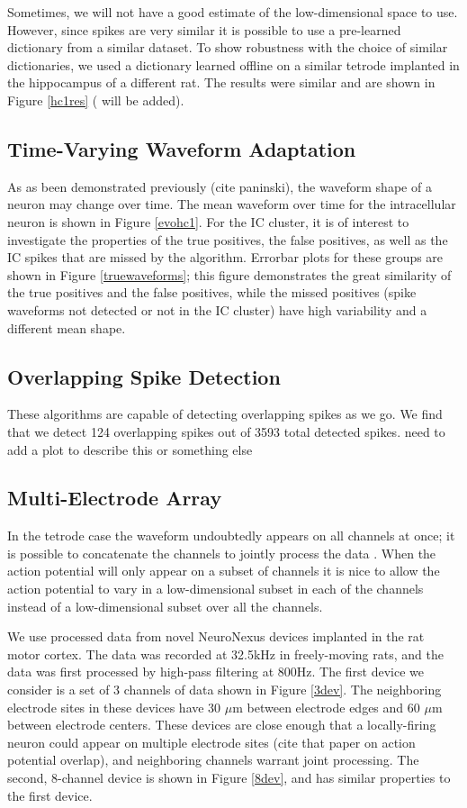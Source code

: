 Sometimes, we will not have a good estimate of the low-dimensional space to use.  However, since spikes are very similar it is possible to use a pre-learned dictionary from a similar dataset.  To show robustness with the choice of similar dictionaries, we used a dictionary learned offline on a similar tetrode implanted in the hippocampus of a different rat.  The results were similar and are shown in Figure \ref{hc1res} ({\color{red} will be added}).

\subsection{Time-Varying Waveform Adaptation}
As as been demonstrated previously (cite paninski), the waveform shape of a neuron may change over time.  The mean waveform over time for the intracellular neuron is shown in Figure \ref{evohc1}.  For the IC cluster, it is of interest to investigate the properties of the true positives, the false positives, as well as the IC spikes that are missed by the algorithm.  Errorbar plots for these groups are shown in Figure \ref{truewaveforms}; this figure demonstrates the great similarity of the true positives and the false positives, while the missed positives (spike waveforms not detected or not in the IC cluster) have high variability and a different mean shape.
\subsection{Overlapping Spike Detection}
These algorithms are capable of detecting overlapping spikes as we go.  We find that we detect 124 overlapping spikes out of 3593 total detected spikes. {\color{red} need to add a plot to describe this or something else}

\subsection{Multi-Electrode Array}
In the tetrode case the waveform undoubtedly appears on all channels at once; it is possible to concatenate the channels to jointly process the data \cite{wood2009}.  When the action potential will only appear on a subset of channels it is nice to allow the action potential to vary in a low-dimensional subset in each of the channels instead of a low-dimensional subset over all the channels. \cite{Prentice2011}

We use processed data from novel NeuroNexus devices implanted in the rat motor cortex.  The data was recorded at 32.5kHz in freely-moving rats, and the data was first processed by high-pass filtering at 800Hz.  The first device we consider is a set of 3 channels of data shown in Figure \ref{3dev}.  The neighboring electrode sites in these devices have 30 $\mu$m between electrode edges and 60 $\mu$m between electrode centers.  These devices are close enough that a locally-firing neuron could appear on multiple electrode sites (cite that paper on action potential overlap), and neighboring channels warrant joint processing.  The second, 8-channel device is shown in Figure \ref{8dev}, and has similar properties to the first device.

